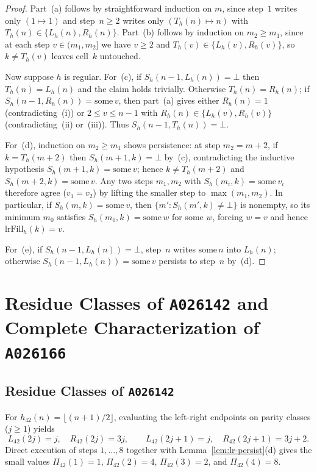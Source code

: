 \documentclass[11pt]{article}
\theoremstyle{definition}
\newcommand{\seq}[1]{\texttt{#1}}
\begin{document}
\begin{proof}
Part~(a) follows by straightforward induction on $m$, since step~$1$ writes only $(1 \mapsto 1)$ and step~$n \ge 2$ writes only $(T_h(n) \mapsto n)$ with $T_h(n) \in \{L_h(n), R_h(n)\}$. Part~(b) follows by induction on $m_2 \ge m_1$, since at each step $v \in (m_1, m_2]$ we have $v \ge 2$ and $T_h(v) \in \{L_h(v), R_h(v)\}$, so $k \ne T_h(v)$ leaves cell~$k$ untouched.

Now suppose $h$ is regular. For~(c), if $S_h(n-1, L_h(n)) = \bot$ then $T_h(n) = L_h(n)$ and the claim holds trivially. Otherwise $T_h(n) = R_h(n)$; if $S_h(n-1, R_h(n)) = \mathrm{some}\,v$, then part~(a) gives either $R_h(n) = 1$ (contradicting~(i)) or $2 \le v \le n - 1$ with $R_h(n) \in \{L_h(v), R_h(v)\}$ (contradicting~(ii) or~(iii)). Thus $S_h(n-1, T_h(n)) = \bot$.

For~(d), induction on $m_2 \ge m_1$ shows persistence: at step $m_2 = m + 2$, if $k = T_h(m+2)$ then $S_h(m+1, k) = \bot$ by~(c), contradicting the inductive hypothesis $S_h(m+1, k) = \mathrm{some}\,v$; hence $k \ne T_h(m+2)$ and $S_h(m+2, k) = \mathrm{some}\,v$. Any two steps $m_1, m_2$ with $S_h(m_i, k) = \mathrm{some}\,v_i$ therefore agree ($v_1 = v_2$) by lifting the smaller step to $\max(m_1, m_2)$. In particular, if $S_h(m, k) = \mathrm{some}\,v$, then $\{m' : S_h(m', k) \ne \bot\}$ is nonempty, so its minimum $m_0$ satisfies $S_h(m_0, k) = \mathrm{some}\,w$ for some $w$, forcing $w = v$ and hence $\mathrm{lrFill}_h(k) = v$.

For~(e), if $S_h(n-1, L_h(n)) = \bot$, step~$n$ writes $\mathrm{some}\,n$ into $L_h(n)$; otherwise $S_h(n-1, L_h(n)) = \mathrm{some}\,v$ persists to step~$n$ by~(d).
\end{proof}

\section{Residue Classes of \seq{A026142} and Complete Characterization of \seq{A026166}}
\label{sec:residues}

\subsection{Residue Classes of \seq{A026142}}

For $h_{42}(n) = \lfloor (n+1)/2 \rfloor$, evaluating the left-right endpoints on parity classes ($j \ge 1$) yields
\begin{equation}
\label{eq:LR42}
L_{42}(2j) = j,\quad R_{42}(2j) = 3j, \qquad
L_{42}(2j + 1) = j,\quad R_{42}(2j + 1) = 3j + 2.
\end{equation}
Direct execution of steps $1, \dots, 8$ together with Lemma~\ref{lem:lr-persist}(d) gives the small values $\Pi_{42}(1) = 1$, $\Pi_{42}(2) = 4$, $\Pi_{42}(3) = 2$, and $\Pi_{42}(4) = 8$.
\end{document}
